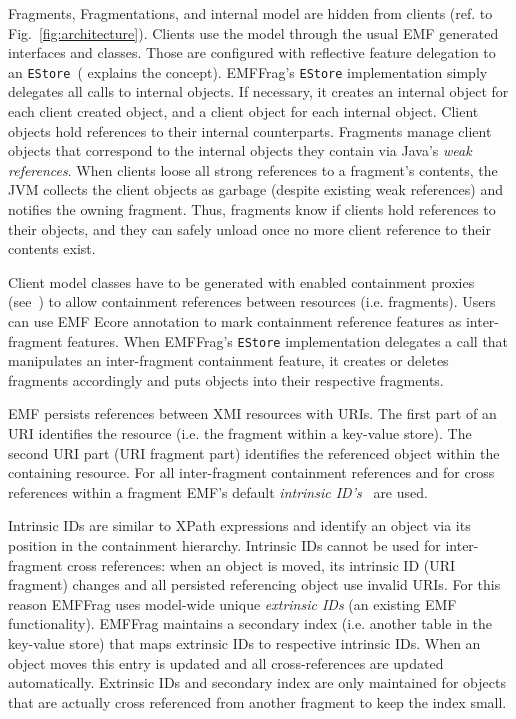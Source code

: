Fragments, Fragmentations, and internal model are hidden from clients (ref. to Fig.~\ref{fig:architecture}). Clients use the model through the usual EMF generated interfaces and classes. Those are configured with reflective feature delegation to an \texttt{EStore}~(\cite{emf2009} explains the concept). 
EMFFrag's \texttt{EStore} implementation simply delegates all calls to internal objects. If necessary, it creates an internal object for each client created object, and a client object for each internal object. Client objects hold references to their internal counterparts. Fragments manage client objects that correspond to the internal objects they contain via Java's \emph{weak references}. When clients loose all strong references to a fragment's contents,  the JVM collects the client objects as garbage (despite existing weak references) and notifies the owning fragment. Thus, fragments know if clients hold references to their objects, and they can safely unload once no more client reference to their contents exist.

Client model classes have to be generated with enabled containment proxies (see~\cite{emf2009}) to allow containment references between resources (i.e. fragments). Users can use EMF Ecore annotation to mark containment reference features as inter-fragment features.
When EMFFrag's \texttt{EStore} implementation delegates a call that manipulates an inter-fragment containment feature, it creates or deletes fragments accordingly and puts objects into their respective fragments.

EMF persists references between XMI resources with URIs. The first part of an URI identifies the resource (i.e. the fragment within a key-value store). The second URI part (URI fragment part) identifies the referenced object within the containing resource. For all inter-fragment containment references and for cross references within a fragment EMF's default \emph{intrinsic ID's}~\cite{emf2009} are used.

Intrinsic IDs are similar to XPath expressions and identify an object via its position in the containment hierarchy. Intrinsic IDs cannot be used for inter-fragment cross references: when an object is moved, its intrinsic ID (URI fragment) changes and all persisted referencing object use invalid URIs. For this reason EMFFrag uses model-wide unique \emph{extrinsic IDs} (an existing EMF functionality). EMFFrag maintains a secondary index (i.e. another table in the key-value store) that maps extrinsic IDs to respective intrinsic IDs. When an object moves this entry is updated and all cross-references are updated automatically. Extrinsic IDs and secondary index are only maintained for objects that are actually cross referenced from another fragment to keep the index small. 